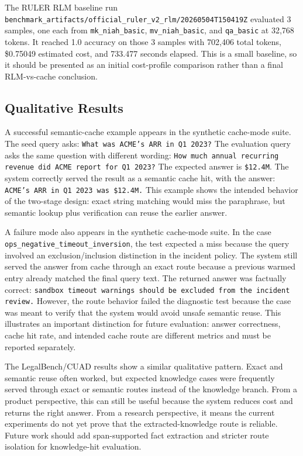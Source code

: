 \documentclass[10pt,a4paper]{article}
\begin{document}
The RULER RLM baseline run \texttt{benchmark\_artifacts/official\_ruler\_v2\_rlm/20260504T150419Z} evaluated 3 samples, one each from \texttt{mk\_niah\_basic}, \texttt{mv\_niah\_basic}, and \texttt{qa\_basic} at 32,768 tokens. It reached 1.0 accuracy on those 3 samples with 702,406 total tokens, \$0.75049 estimated cost, and 733.477 seconds elapsed. This is a small baseline, so it should be presented as an initial cost-profile comparison rather than a final RLM-vs-cache conclusion.

\subsection{Qualitative Results}

A successful semantic-cache example appears in the synthetic cache-mode suite. The seed query asks: \texttt{What was ACME's ARR in Q1 2023?} The evaluation query asks the same question with different wording: \texttt{How much annual recurring revenue did ACME report for Q1 2023?} The expected answer is \texttt{\$12.4M}. The system correctly served the result as a semantic cache hit, with the answer: \texttt{ACME's ARR in Q1 2023 was \$12.4M.} This example shows the intended behavior of the two-stage design: exact string matching would miss the paraphrase, but semantic lookup plus verification can reuse the earlier answer.

A failure mode also appears in the synthetic cache-mode suite. In the case \texttt{ops\_negative\_timeout\_inversion}, the test expected a miss because the query involved an exclusion/inclusion distinction in the incident policy. The system still served the answer from cache through an exact route because a previous warmed entry already matched the final query text. The returned answer was factually correct: \texttt{sandbox timeout warnings should be excluded from the incident review.} However, the route behavior failed the diagnostic test because the case was meant to verify that the system would avoid unsafe semantic reuse. This illustrates an important distinction for future evaluation: answer correctness, cache hit rate, and intended cache route are different metrics and must be reported separately.

The LegalBench/CUAD results show a similar qualitative pattern. Exact and semantic reuse often worked, but expected knowledge cases were frequently served through exact or semantic routes instead of the knowledge branch. From a product perspective, this can still be useful because the system reduces cost and returns the right answer. From a research perspective, it means the current experiments do not yet prove that the extracted-knowledge route is reliable. Future work should add span-supported fact extraction and stricter route isolation for knowledge-hit evaluation.
\end{document}
